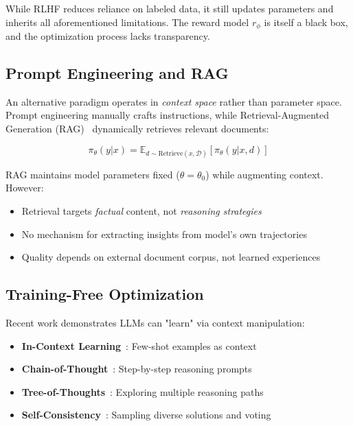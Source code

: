 \documentclass[11pt,letterpaper]{article}
\begin{document}
While RLHF reduces reliance on labeled data, it still updates parameters and inherits all aforementioned limitations. The reward model $r_\phi$ is itself a black box, and the optimization process lacks transparency.

\subsection{Prompt Engineering and RAG}

An alternative paradigm operates in \textit{context space} rather than parameter space. Prompt engineering manually crafts instructions, while Retrieval-Augmented Generation (RAG)~\cite{lewis2020retrieval} dynamically retrieves relevant documents:

\begin{equation}
\pi_\theta(y | x) = \mathbb{E}_{d \sim \text{Retrieve}(x, \mathcal{D})}[\pi_\theta(y | x, d)]
\end{equation}

RAG maintains model parameters fixed ($\theta = \theta_0$) while augmenting context. However:

\begin{itemize}
    \item Retrieval targets \textit{factual} content, not \textit{reasoning strategies}
    \item No mechanism for extracting insights from model's own trajectories
    \item Quality depends on external document corpus, not learned experiences
\end{itemize}

\subsection{Training-Free Optimization}

Recent work demonstrates LLMs can "learn" via context manipulation:

\begin{itemize}
    \item \textbf{In-Context Learning}~\cite{brown2020language}: Few-shot examples as context
    \item \textbf{Chain-of-Thought}~\cite{wei2022chain}: Step-by-step reasoning prompts
    \item \textbf{Tree-of-Thoughts}~\cite{yao2023tree}: Exploring multiple reasoning paths
    \item \textbf{Self-Consistency}~\cite{wang2022self}: Sampling diverse solutions and voting
\end{itemize}
\end{document}

